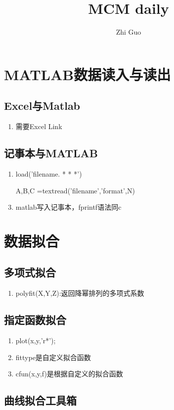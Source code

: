 \documentclass[12pt,a4paper]{article}
\title{MCM daily}
\author{Zhi Guo}
\begin{document}
\maketitle
\section{MATLAB数据读入与读出}
\subsection{Excel与Matlab}
\begin{enumerate}
  \item 需要Excel Link
\end{enumerate}

\subsection{记事本与MATLAB}
\begin{enumerate}
  \item load('filename. * * *')
  \item [A,B,C]=textread('filename','format',N)
  \item matlab写入记事本，fprintf语法同c
\end{enumerate}


\section{数据拟合}
\subsection{多项式拟合}
\begin{enumerate}
  \item polyfit(X,Y,Z):返回降幂排列的多项式系数
\end{enumerate}
\subsection{指定函数拟合}
\begin{enumerate}
  \item plot(x,y,'r*');
  \item fittype是自定义拟合函数
  \item cfun(x,y,f)是根据自定义的拟合函数
\end{enumerate}

\subsection{曲线拟合工具箱}
\end{document}
